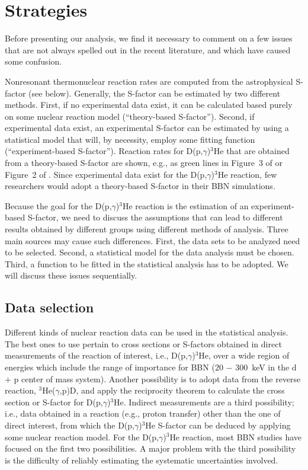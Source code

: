 \documentclass[twocolumn]{aastex63}
\begin{document}
\section{Strategies} 
\label{sec:strategies}
Before presenting our analysis, we find it necessary to comment on a few issues that are not always spelled out in the recent literature, and which have caused some confusion. 

Nonresonant thermonuclear reaction rates are computed from the astrophysical S-factor (see below). Generally, the S-factor can be estimated by two different methods. First, if no experimental data exist, it can be calculated based purely on some nuclear reaction model (``theory-based S-factor''). Second, if experimental data exist, an experimental S-factor can be estimated by using a statistical model that will, by necessity, employ some fitting function (``experiment-based S-factor''). Reaction rates for D(p,$\gamma$)$^3$He that are obtained from a theory-based S-factor are shown, e.g., as green lines in Figure~3 of \citet{Pis21} or Figure~2 of \citet{Yeh21}. Since experimental data exist for the D(p,$\gamma$)$^3$He reaction, few researchers would adopt a theory-based S-factor in their BBN simulations.

Because the goal for the D(p,$\gamma$)$^3$He reaction is the estimation of an experiment-based S-factor, we need to discuss the assumptions that can lead to different results obtained by different groups using different methods of analysis. Three main sources may cause such differences. First, the data sets to be analyzed need to be selected. Second, a statistical model for the data analysis must be chosen. Third, a function to be fitted in the statistical analysis has to be adopted. We will discuss these issues sequentially.

\subsection{Data selection} 
\label{sec:selection}
Different kinds of nuclear reaction data can be used in the statistical analysis. The best ones to use pertain to cross sections or S-factors obtained in direct measurements of the reaction of interest, i.e., D(p,$\gamma$)$^3$He, over a wide region of energies which include the range of importance for BBN ($20$ $-$ $300$~keV in the d $+$ p center of mass system). Another possibility is to adopt data from the reverse reaction, $^3$He($\gamma$,p)D, and apply the reciprocity theorem to calculate the cross section or S-factor for D(p,$\gamma$)$^3$He. Indirect measurements are a third possibility; i.e., data obtained in a reaction (e.g., proton transfer) other than the one of direct interest, from which the D(p,$\gamma$)$^3$He S-factor can be deduced by applying some nuclear reaction model. For the D(p,$\gamma$)$^3$He reaction, most BBN studies have focused on the first two possibilities. A major problem with the third possibility is the difficulty of reliably estimating the systematic uncertainties involved.
\end{document}
